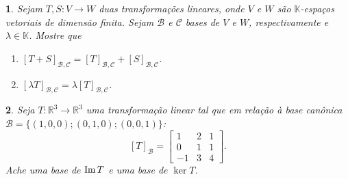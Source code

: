 \documentclass[12pt]{exam}
\newtheorem{exercicio}{}
\newcommand{\im}{{\rm Im\,}}
\newcommand{\real}{\mathbb{R}}
\newcommand{\cp}[1]{\mathbb{#1}}
\begin{document}
\begin{exercicio}
  Sejam $T, S : V \to W$ duas transforma\c{c}\~oes lineares, onde $V$ e $W$ s\~ao $\cp{K}$-espa\c{c}os vetoriais de dimens\~ao finita. Sejam $\mathcal{B}$ e $\mathcal{C}$ bases de $V$ e $W$, respectivamente e $\lambda \in \cp{K}$. Mostre que
  \begin{enumerate}[label=({\alph*})]
    \item $[T + S]_{\mathcal{B}, \mathcal{C}} = [T]_{\mathcal{B}, \mathcal{C}} + [S]_{\mathcal{B}, \mathcal{C}}$.
    \item $[\lambda T]_{\mathcal{B}, \mathcal{C}} = \lambda [T]_{\mathcal{B}, \mathcal{C}}$.
  \end{enumerate}
\end{exercicio}

\begin{exercicio}
  Seja $T : \real^3 \to \real^3$ uma transforma\c{c}\~ao linear tal que em rela\c{c}\~ao \`a base can\^onica $\mathcal{B} = \{(1,0,0); (0,1,0); (0,0,1)\}$:
  \[
    [T]_\mathcal{B} =\begin{bmatrix}
      1 & 2 & 1\\
      0 & 1 & 1\\
      -1 & 3 & 4
    \end{bmatrix}.
  \]
  Ache uma base de $\im T$ e uma base de $\ker T$.
\end{exercicio}
\end{document}
